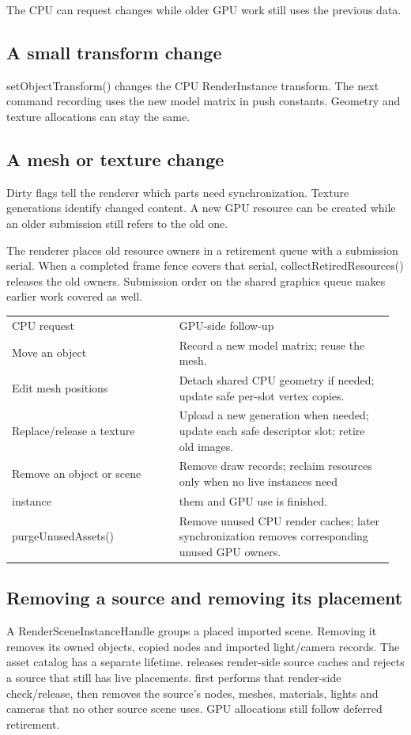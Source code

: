 \documentclass[11pt,a4paper]{article}
\begin{document}
\label{core-42}
The CPU can request changes while older GPU work still uses the previous data.

\subsection*{A small transform change}
setObjectTransform() changes the CPU RenderInstance transform. The next command recording uses the new model matrix in push constants. Geometry and texture allocations can stay the same.

\subsection*{A mesh or texture change}
Dirty flags tell the renderer which parts need synchronization. Texture generations identify changed content. A new GPU resource can be created while an older submission still refers to the old one.

The renderer places old resource owners in a retirement queue with a submission serial. When a completed frame fence covers that serial, collectRetiredResources() releases the old owners. Submission order on the shared graphics queue makes earlier work covered as well.

{\small
\begin{longtable}{@{}p{0.42\linewidth}p{0.54\linewidth}@{}}
CPU request & GPU-side follow-up \\
Move an object & Record a new model matrix; reuse the mesh. \\
Edit mesh positions & Detach shared CPU geometry if needed; update safe per-slot vertex copies. \\
Replace/release a texture & Upload a new generation when needed; update each safe descriptor slot; retire old images. \\
Remove an object or scene & Remove draw records; reclaim resources only when no live instances need \\
instance & them and GPU use is finished. \\
purgeUnusedAssets() & Remove unused CPU render caches; later synchronization removes corresponding unused GPU owners. \\
\end{longtable}
}

\subsection*{Removing a source and removing its placement}
A RenderSceneInstanceHandle groups a placed imported scene. Removing it removes its owned objects, copied nodes and imported light/camera records. The asset catalog has a separate lifetime.  releases render-side source caches and rejects a source that still has live placements.  first performs that render-side check/release, then removes the source's nodes, meshes, materials, lights and cameras that no other source scene uses. GPU allocations still follow deferred retirement.
\end{document}
